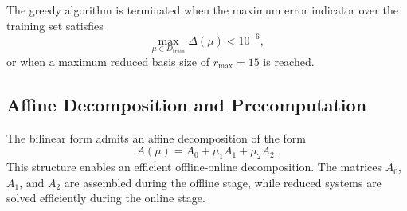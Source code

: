 \documentclass[11pt]{article}      %
\begin{document}
The greedy algorithm is terminated when the maximum error indicator over the training set satisfies
\[
\max_{\mu \in D_{\text{train}}} \Delta(\mu) < 10^{-6},
\]
or when a maximum reduced basis size of $r_{\max} = 15$ is reached.

\subsection{Affine Decomposition and Precomputation}

The bilinear form admits an affine decomposition of the form
\[
A(\mu) = A_0 + \mu_1 A_1 + \mu_2 A_2.
\]
This structure enables an efficient offline-online decomposition. The matrices $A_0$, $A_1$, and $A_2$ are assembled during the offline stage, while reduced systems are solved efficiently during the online stage.
\end{document}
